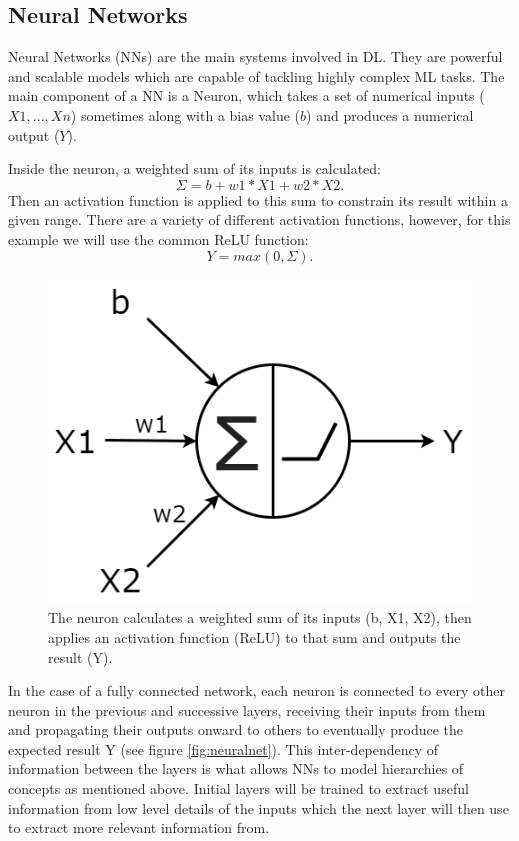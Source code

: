 \documentclass{l4proj}
\begin{document}
\subsection{Neural Networks}
\label{nn}
Neural Networks (NNs) are the main systems involved in DL. They are powerful and scalable models which are capable of tackling highly complex ML tasks. The main component of a NN is a Neuron, which takes a set of numerical inputs ($X1, ... , Xn$) sometimes along with a bias value ($b$) and produces a numerical output ($Y$).

Inside the neuron, a weighted sum of its inputs is calculated:
\begin{equation}
    \Sigma = b + w1 * X1 + w2 * X2.
\end{equation}
Then an activation function is applied to this sum to constrain its result within a given range. There are a variety of different activation functions, however, for this example we will use the common ReLU function:
\begin{equation}\label{eq:sigma} 
    Y = max(0, \Sigma).
\end{equation}

\begin{figure}[h]
    \centering
    \includegraphics[width=0.4\linewidth]{images/Neuron.png}    

    \caption{The neuron calculates a weighted sum of its inputs (b, X1, X2), then applies an activation function (ReLU) to that sum and outputs the result (Y).}

    \label{fig:neuron} 
\end{figure}

In the case of a fully connected network, each neuron is connected to every other neuron in the previous and successive layers, receiving their inputs from them and propagating their outputs onward to others to eventually produce the expected result Y (see figure \ref{fig:neuralnet}). This inter-dependency of information between the layers is what allows NNs to model hierarchies of concepts as mentioned above. Initial layers will be trained to extract useful information from low level details of the inputs which the next layer will then use to extract more relevant information from. 
\end{document}
